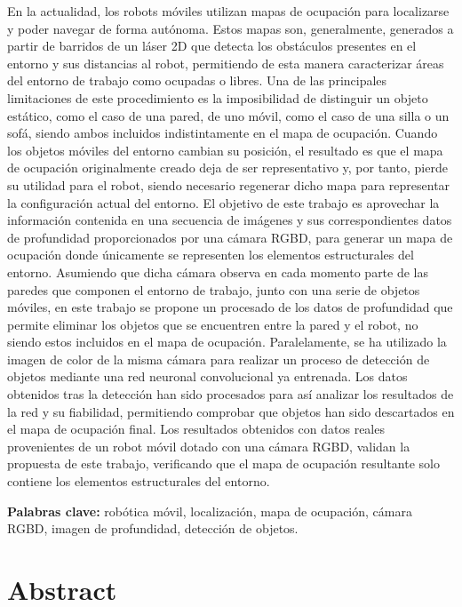 En la actualidad, los robots móviles utilizan mapas de ocupación para localizarse y poder navegar de forma autónoma. Estos mapas son, generalmente, generados a partir de barridos de un láser 2D que detecta los obstáculos presentes en el entorno y sus distancias al robot, permitiendo de esta manera caracterizar áreas del entorno de trabajo como ocupadas o libres. Una de las principales limitaciones de este procedimiento es la imposibilidad de distinguir un objeto estático, como el caso de una pared, de uno móvil, como el caso de una silla o un sofá, siendo ambos incluidos indistintamente en el mapa de ocupación. Cuando los objetos móviles del entorno cambian su posición, el resultado es que el mapa de ocupación originalmente creado deja de ser representativo y, por tanto, pierde su utilidad para el robot, siendo necesario regenerar dicho mapa para representar la configuración actual del entorno. El objetivo de este trabajo es aprovechar la información contenida en una secuencia de imágenes y sus correspondientes datos de profundidad proporcionados por una cámara RGBD, para generar un mapa de ocupación donde únicamente se representen los elementos estructurales del entorno. Asumiendo que dicha cámara observa en cada momento parte de las paredes que componen el entorno de trabajo, junto con una serie de objetos móviles, en este trabajo se propone un procesado de los datos de profundidad que permite eliminar los objetos que se encuentren entre la pared y el robot, no siendo estos incluidos en el mapa de ocupación. Paralelamente, se ha utilizado la imagen de color de la misma cámara para realizar un proceso de detección de objetos mediante una red neuronal convolucional ya entrenada. Los datos obtenidos tras la detección han sido procesados para así analizar los resultados de la red y su fiabilidad, permitiendo comprobar que objetos han sido descartados en el mapa de ocupación final. Los resultados obtenidos con datos reales provenientes de un robot móvil dotado con una cámara RGBD, validan la propuesta de este trabajo, verificando que el mapa de ocupación resultante solo contiene los elementos estructurales del entorno. 

\vspace{2.5cm}

\textbf{Palabras clave:} robótica móvil, localización, mapa de ocupación, cámara RGBD, imagen de profundidad, detección de objetos.

\chapter*{Abstract}


